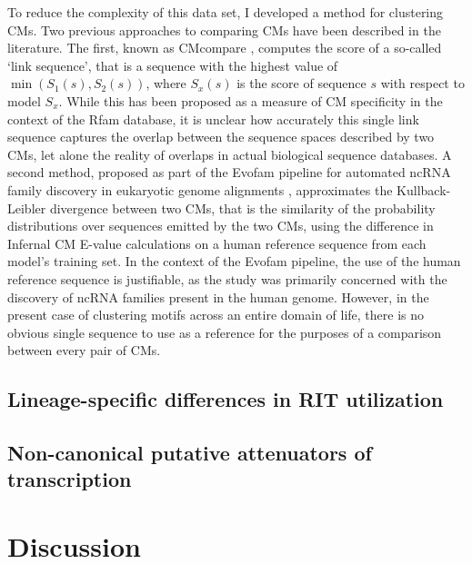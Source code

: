 To reduce the complexity of this data set, I developed a method for clustering CMs. Two previous approaches to comparing CMs have been described in the literature. The first, known as CMcompare \parencite{Honer-zu-Siederdissen2010}, computes the score of a so-called `link sequence', that is a sequence with the highest value of $\min{(S_1(s), S_2(s))}$, where $S_x(s)$ is the score of sequence $s$ with respect to model $S_x$. While this has been proposed as a measure of CM specificity in the context of the Rfam database, it is unclear how accurately this single link sequence captures the overlap between the sequence spaces described by two CMs, let alone the reality of overlaps in actual biological sequence databases. A second method, proposed as part of the Evofam pipeline for automated ncRNA family discovery in eukaryotic genome alignments \parencite{Parker2011}, approximates the Kullback-Leibler divergence between two CMs, that is the similarity of the probability distributions over sequences emitted by the two CMs, using the difference in Infernal CM E-value calculations on a human reference sequence from each model's training set. In the context of the Evofam pipeline, the use of the human reference sequence is justifiable, as the study was primarily concerned with the discovery of ncRNA families present in the human genome. However, in the present case of clustering motifs across an entire domain of life, there is no obvious single sequence to use as a reference for the purposes of a comparison between every pair of CMs.

\subsection{Lineage-specific differences in RIT utilization}

\subsection{Non-canonical putative attenuators of transcription}

\section{Discussion}